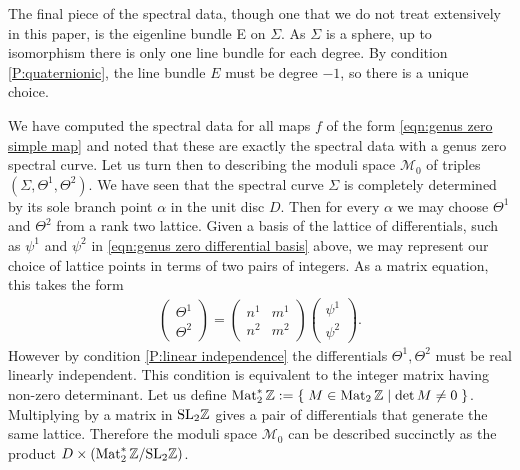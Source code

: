 \documentclass{article}
\begin{document}



The final piece of the spectral data, though one that we do not treat extensively in this paper, is the eigenline bundle E on $\Sigma$. As $\Sigma$ is a sphere, up to isomorphism there is only one line bundle for each degree. By condition \ref{P:quaternionic}, the line bundle $E$ must be degree $-1$, so there is a unique choice.





We have computed the spectral data for all maps $f$ of the form \eqref{eqn:genus zero simple map} and noted that these are exactly the spectral data with a genus zero spectral curve. 
Let us turn then to describing the moduli space $\mathcal{M}_0$ of triples $(\Sigma,\Theta^1,\Theta^2)$. We have seen that the spectral curve $\Sigma$ is completely determined by its sole branch point $\alpha$ in the unit disc $D$. Then for every $\alpha$ we may choose $\Theta^1$ and $\Theta^2$ from a rank two lattice. Given a basis of the lattice of differentials, such as $\psi^1$ and $\psi^2$ in \eqref{eqn:genus zero differential basis} above, we may represent our choice of lattice points in terms of two pairs of integers. As a matrix equation, this takes the form
\begin{align*}
\begin{pmatrix}
\Theta^1 \\ \Theta^2
\end{pmatrix}
=
\begin{pmatrix}
n^1 & m^1 \\
n^2 & m^2
\end{pmatrix}
\begin{pmatrix}
\psi^1 \\ \psi^2
\end{pmatrix}.
\end{align*}
However by condition \ref{P:linear independence} the differentials $\Theta^1, \Theta^2$ must be real linearly independent. This condition is equivalent to the integer matrix having non-zero determinant. Let us define $\operatorname{Mat}_2^*\mathbb{Z} := \left\{\;  M \in \operatorname{Mat}_2\mathbb{Z}  \;\middle|\; \det M \neq 0 \;\right\}$. Multiplying by a matrix in $\mathrm{SL}_2\mathbb{Z}$ gives a pair of differentials that generate the same lattice. Therefore the moduli space $\mathcal{M}_0$ can be described succinctly as the product $D \times (\operatorname{Mat}_2^*\mathbb{Z}/\mathrm{SL}_2\mathbb{Z})$. 


\end{document}
